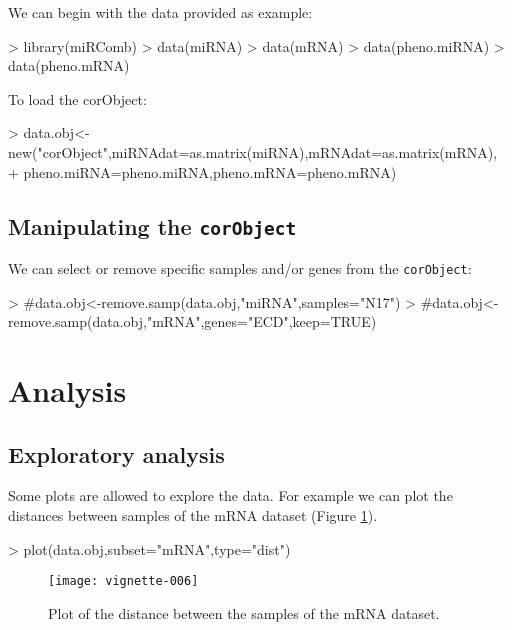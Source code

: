 \documentclass{article}
\begin{document}
We can begin with the data provided as example:
\begin{Schunk}
\begin{Sinput}
> library(miRComb)
> data(miRNA)
> data(mRNA)
> data(pheno.miRNA)
> data(pheno.mRNA)
\end{Sinput}
\end{Schunk}

To load the corObject:
\begin{Schunk}
\begin{Sinput}
> data.obj<-new("corObject",miRNAdat=as.matrix(miRNA),mRNAdat=as.matrix(mRNA),
+ 	pheno.miRNA=pheno.miRNA,pheno.mRNA=pheno.mRNA)
\end{Sinput}
\end{Schunk}

\subsection{Manipulating the \texttt{corObject}}
We can select or remove specific samples and/or genes from the \texttt{corObject}:
\begin{Schunk}
\begin{Sinput}
> #data.obj<-remove.samp(data.obj,"miRNA",samples="N17")
> #data.obj<-remove.samp(data.obj,"mRNA",genes="ECD",keep=TRUE)
\end{Sinput}
\end{Schunk}


\section{Analysis}
\subsection{Exploratory analysis}
Some plots are allowed to explore the data. For example we can plot the distances between samples of the mRNA dataset (Figure \ref{fig:dist}).\\
\begin{Schunk}
\begin{Sinput}
> plot(data.obj,subset="mRNA",type="dist")
\end{Sinput}
\end{Schunk}

\begin{figure}[!h]
\centering
\texttt{[image: vignette-006]}
\caption[]{Plot of the distance between the samples of the mRNA dataset.}
\label{fig:dist}
\end{figure}
\end{document}
